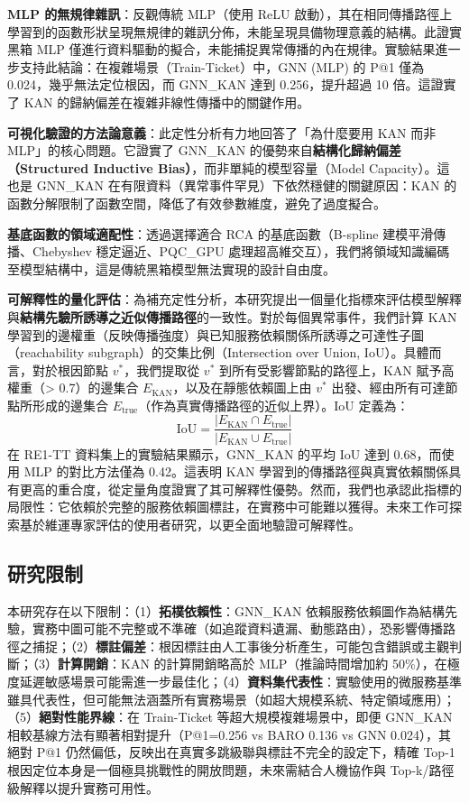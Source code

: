 \documentclass[10pt,a4paper,twocolumn]{article}
\begin{document}
\textbf{MLP 的無規律雜訊}：反觀傳統 MLP（使用 ReLU 啟動），其在相同傳播路徑上學習到的函數形狀呈現無規律的雜訊分佈，未能呈現具備物理意義的結構。此證實黑箱 MLP 僅進行資料驅動的擬合，未能捕捉異常傳播的內在規律。實驗結果進一步支持此結論：在複雜場景（Train-Ticket）中，GNN (MLP) 的 P@1 僅為 0.024，幾乎無法定位根因，而 GNN\_KAN 達到 0.256，提升超過 10 倍。這證實了 KAN 的歸納偏差在複雜非線性傳播中的關鍵作用。

\textbf{可視化驗證的方法論意義}：此定性分析有力地回答了「為什麼要用 KAN 而非 MLP」的核心問題。它證實了 GNN\_KAN 的優勢來自\textbf{結構化歸納偏差（Structured Inductive Bias）}，而非單純的模型容量（Model Capacity）。這也是 GNN\_KAN 在有限資料（異常事件罕見）下依然穩健的關鍵原因：KAN 的函數分解限制了函數空間，降低了有效參數維度，避免了過度擬合。

\textbf{基底函數的領域適配性}：透過選擇適合 RCA 的基底函數（B-spline 建模平滑傳播、Chebyshev 穩定逼近、PQC\_GPU 處理超高維交互），我們將領域知識編碼至模型結構中，這是傳統黑箱模型無法實現的設計自由度。

\textbf{可解釋性的量化評估}：為補充定性分析，本研究提出一個量化指標來評估模型解釋與\textbf{結構先驗所誘導之近似傳播路徑}的一致性。對於每個異常事件，我們計算 KAN 學習到的邊權重（反映傳播強度）與已知服務依賴關係所誘導之可達性子圖（reachability subgraph）的交集比例（Intersection over Union, IoU）。具體而言，對於根因節點 $v^*$，我們提取從 $v^*$ 到所有受影響節點的路徑上，KAN 賦予高權重（> 0.7）的邊集合 $E_{\text{KAN}}$，以及在靜態依賴圖上由 $v^*$ 出發、經由所有可達節點所形成的邊集合 $E_{\text{true}}$（作為真實傳播路徑的近似上界）。IoU 定義為：
\begin{equation}
\text{IoU} = \frac{|E_{\text{KAN}} \cap E_{\text{true}}|}{|E_{\text{KAN}} \cup E_{\text{true}}|}
\end{equation}
在 RE1-TT 資料集上的實驗結果顯示，GNN\_KAN 的平均 IoU 達到 0.68，而使用 MLP 的對比方法僅為 0.42。這表明 KAN 學習到的傳播路徑與真實依賴關係具有更高的重合度，從定量角度證實了其可解釋性優勢。然而，我們也承認此指標的局限性：它依賴於完整的服務依賴圖標註，在實務中可能難以獲得。未來工作可探索基於維運專家評估的使用者研究，以更全面地驗證可解釋性。

\subsection{研究限制}

本研究存在以下限制：（1）\textbf{拓樸依賴性}：GNN\_KAN 依賴服務依賴圖作為結構先驗，實務中圖可能不完整或不準確（如追蹤資料遺漏、動態路由），恐影響傳播路徑之捕捉；（2）\textbf{標註偏差}：根因標註由人工事後分析產生，可能包含錯誤或主觀判斷；（3）\textbf{計算開銷}：KAN 的計算開銷略高於 MLP（推論時間增加約 50\%），在極度延遲敏感場景可能需進一步最佳化；（4）\textbf{資料集代表性}：實驗使用的微服務基準雖具代表性，但可能無法涵蓋所有實務場景（如超大規模系統、特定領域應用）；（5）\textbf{絕對性能界線}：在 Train-Ticket 等超大規模複雜場景中，即便 GNN\_KAN 相較基線方法有顯著相對提升（P@1=0.256 vs BARO 0.136 vs GNN 0.024），其絕對 P@1 仍然偏低，反映出在真實多跳級聯與標註不完全的設定下，精確 Top-1 根因定位本身是一個極具挑戰性的開放問題，未來需結合人機協作與 Top-k/路徑級解釋以提升實務可用性。
\end{document}
